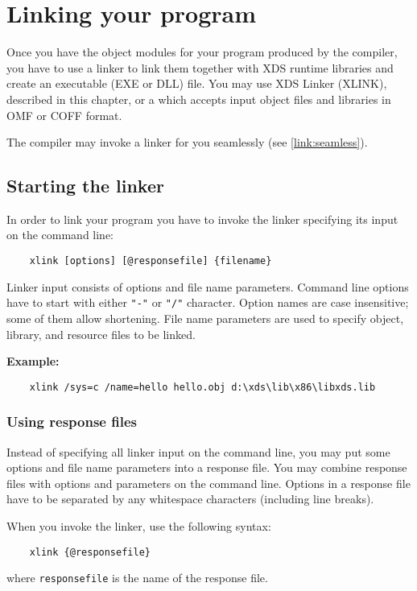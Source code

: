 \chapter {Linking your program}
\label{link}

 Once you have the object modules for your program produced by the
 compiler, you have to use a linker to link them together with
 XDS runtime libraries and create an executable (EXE or DLL) file.
 You may use XDS Linker (XLINK), described in this chapter,
 or a 
 which accepts input object files and libraries in OMF
 or COFF format.

 The compiler may invoke a linker for you seamlessly (see \ref{link:seamless}).

\section{Starting the linker}

 In order to link your program you have to invoke the linker specifying
 its input on the command line:

\verb'    xlink [options] [@responsefile] {filename}'

 Linker input consists of options and file name parameters.
 Command line options have to start with either \verb'"-"' or \verb'"/"' character.
 Option names are case insensitive; some of them allow shortening.
 File name parameters are used to specify object, library, and resource
 files to be linked.

 {\bf Example:}

 \verb'    xlink /sys=c /name=hello hello.obj d:\xds\lib\x86\libxds.lib'

\subsection{Using response files}

 Instead of specifying all linker input on the command line, you may put
 some options and file name parameters into a response file. You may combine
 response files with options and parameters on the command line.
 Options in a response file have to be separated by any whitespace characters
 (including line breaks).

 When you invoke the linker, use the following syntax:

\verb'    xlink {@responsefile}'

 where \verb'responsefile' is the name of the response file.

